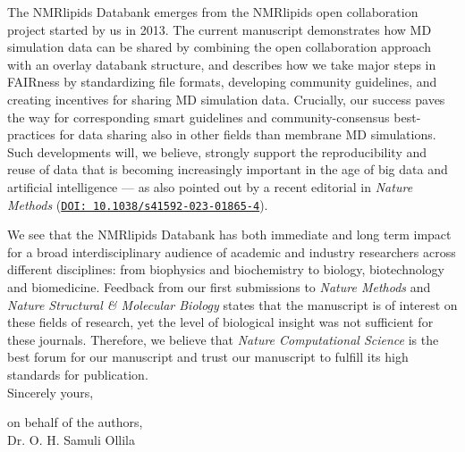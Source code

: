 \documentclass[11pt]{letter}
\begin{document}

The NMRlipids Databank emerges from the NMRlipids open collaboration project started by us in 2013.
The current manuscript demonstrates how MD simulation data can be shared by combining the open collaboration approach with an overlay databank structure, and describes how we take major steps in FAIRness by standardizing file formats, developing community guidelines, and creating incentives for sharing MD simulation data. Crucially, our success paves the way for corresponding smart guidelines and community-consensus best-practices for data sharing also in other fields than membrane MD simulations.
Such developments will, we believe, strongly support the reproducibility and reuse of data that is becoming increasingly important in the age of big data and artificial intelligence --- as also pointed out by a recent editorial in \textit{Nature Methods} (\href{https://doi.org/10.1038/s41592-023-01865-4}{\tt DOI: 10.1038/s41592-023-01865-4}). 

We see that the NMRlipids Databank has both immediate and long term impact for a broad interdisciplinary audience of academic and industry researchers across different disciplines: from biophysics and biochemistry to biology, biotechnology and biomedicine. Feedback from our first submissions to \textit{Nature Methods} and \textit{ Nature Structural \& Molecular Biology} states that the manuscript is of interest on these fields of research, yet the level of biological insight was not sufficient for these journals. Therefore, we believe that \textit{ Nature Computational Science} is the best forum for our manuscript and trust our manuscript to fulfill its high standards for publication. \\


Sincerely yours,

on behalf of the authors,\\

Dr. O. H. Samuli Ollila
\end{document}
